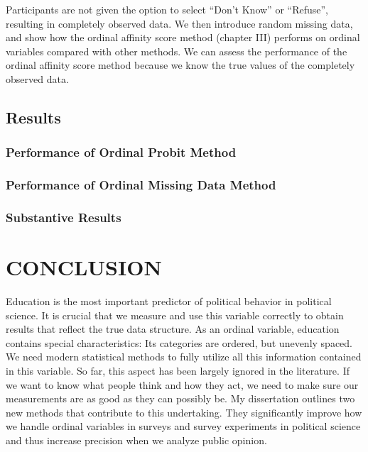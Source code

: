 \documentclass[12pt,econ]{sources/authesis}
\begin{document}
Participants are not given the option to select ``Don't Know'' or ``Refuse'', resulting in completely observed data. We then introduce random missing data, and show how the ordinal affinity score method (chapter III) performs on ordinal variables compared with other methods. We can assess the performance of the ordinal affinity score method because we know the true values of the completely observed data.

\hypertarget{framing-results}{%
\section{Results}\label{framing-results}}

\hypertarget{framing-results-op}{%
\subsection{Performance of Ordinal Probit Method}\label{framing-results-op}}

\hypertarget{framing-results-missing}{%
\subsection{Performance of Ordinal Missing Data Method}\label{framing-results-missing}}

\hypertarget{framing-results-substantive}{%
\subsection{Substantive Results}\label{framing-results-substantive}}

\hypertarget{conclusion}{%
\chapter{CONCLUSION}\label{conclusion}}

Education is the most important predictor of political behavior in political science. It is crucial that we measure and use this variable correctly to obtain results that reflect the true data structure. As an ordinal variable, education contains special characteristics: Its categories are ordered, but unevenly spaced. We need modern statistical methods to fully utilize all this information contained in this variable. So far, this aspect has been largely ignored in the literature. If we want to know what people think and how they act, we need to make sure our measurements are as good as they can possibly be. My dissertation outlines two new methods that contribute to this undertaking. They significantly improve how we handle ordinal variables in surveys and survey experiments in political science and thus increase precision when we analyze public opinion.
\end{document}
